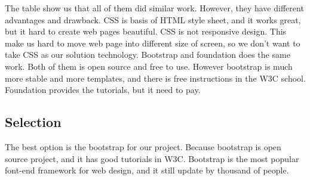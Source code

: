 The table show us that all of them did similar work. However, they have different advantages and drawback. CSS is basis of HTML style sheet, and it works great, but it hard to create web pages beautiful. CSS is not responsive design. This make us hard to move web page into different size of screen, so we don't want to take CSS as our solution technology. Bootstrap and foundation does the same work. Both of them is open source and free to use. However bootstrap is much more stable and more templates, and there is free instructions in the W3C school. Foundation provides the tutorials, but it need to pay.


\subsection{Selection}
The best option is the bootstrap for our project. Because bootstrap is open source project, and it has good tutorials in W3C. Bootstrap is the most popular font-end framework for web design, and it still update by thousand of people.
